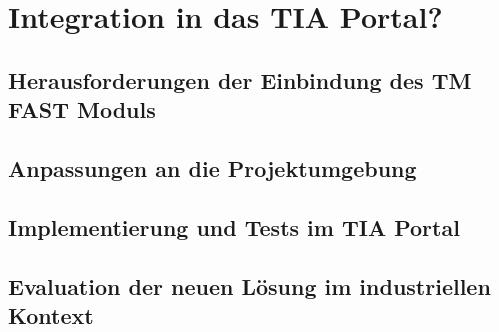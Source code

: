 \chapter{Integration in das TIA Portal?} %
\section{Herausforderungen der Einbindung des TM FAST Moduls}
\section{Anpassungen an die Projektumgebung}
\section{Implementierung und Tests im TIA Portal}
\section{Evaluation der neuen Lösung im industriellen Kontext}